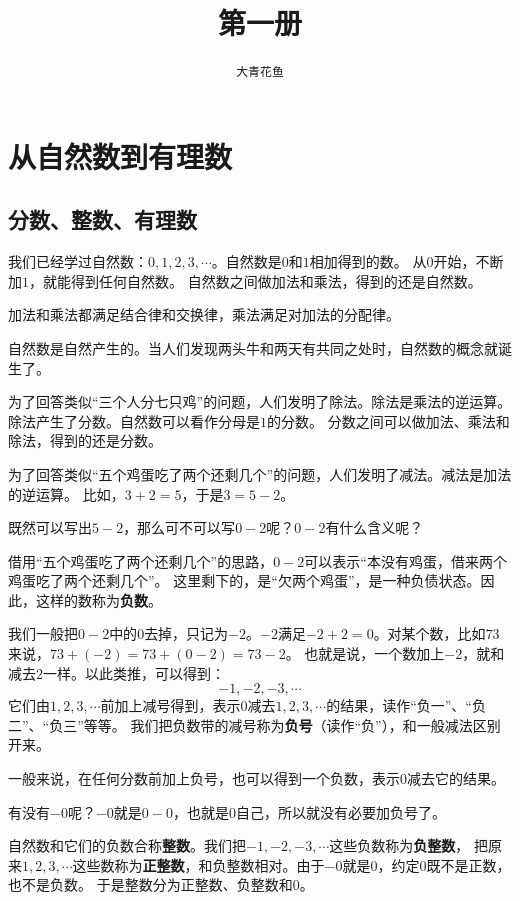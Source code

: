 \documentclass[12pt,UTF8]{ctexbook}
\title{\zihao{0} \bfseries 第一册}
\author{\zihao{2} \texttt{大青花鱼}}
\date{}
\begin{document}
\maketitle
\tableofcontents
\newpage

\chapter{从自然数到有理数}

\section{分数、整数、有理数}
我们已经学过自然数：$0,1,2,3,\cdots$。自然数是$0$和$1$相加得到的数。
从$0$开始，不断加$1$，就能得到任何自然数。
自然数之间做加法和乘法，得到的还是自然数。

加法和乘法都满足结合律和交换律，乘法满足对加法的分配律。

自然数是自然产生的。当人们发现两头牛和两天有共同之处时，自然数的概念就诞生了。

为了回答类似“三个人分七只鸡”的问题，人们发明了除法。除法是乘法的逆运算。除法产生了分数。自然数可以看作分母是$1$的分数。
分数之间可以做加法、乘法和除法，得到的还是分数。

为了回答类似“五个鸡蛋吃了两个还剩几个”的问题，人们发明了减法。减法是加法的逆运算。
比如，$3+2=5$，于是$3=5 - 2$。

既然可以写出$5-2$，那么可不可以写$0-2$呢？$0-2$有什么含义呢？

借用“五个鸡蛋吃了两个还剩几个”的思路，$0-2$可以表示“本没有鸡蛋，借来两个鸡蛋吃了两个还剩几个”。
这里剩下的，是“欠两个鸡蛋”，是一种负债状态。因此，这样的数称为\textbf{负数}。

我们一般把$0-2$中的$0$去掉，只记为$-2$。$-2$满足$-2+2=0$。对某个数，比如$73$来说，$73+(-2)=73+(0-2)=73-2$。
也就是说，一个数加上$-2$，就和减去$2$一样。以此类推，可以得到：
$$ -1, -2, -3, \cdots $$
它们由$1,2,3,\cdots$前加上减号得到，表示$0$减去$1,2,3,\cdots$的结果，读作“负一”、“负二”、“负三”等等。
我们把负数带的减号称为\textbf{负号}（读作“负”），和一般减法区别开来。

一般来说，在任何分数前加上负号，也可以得到一个负数，表示$0$减去它的结果。

有没有$-0$呢？$-0$就是$0-0$，也就是$0$自己，所以就没有必要加负号了。

自然数和它们的负数合称\textbf{整数}。我们把$-1, -2, -3, \cdots$这些负数称为\textbf{负整数}，
把原来$1,2,3,\cdots$这些数称为\textbf{正整数}，和负整数相对。由于$-0$就是$0$，约定$0$既不是正数，也不是负数。
于是整数分为正整数、负整数和$0$。
\end{document}

